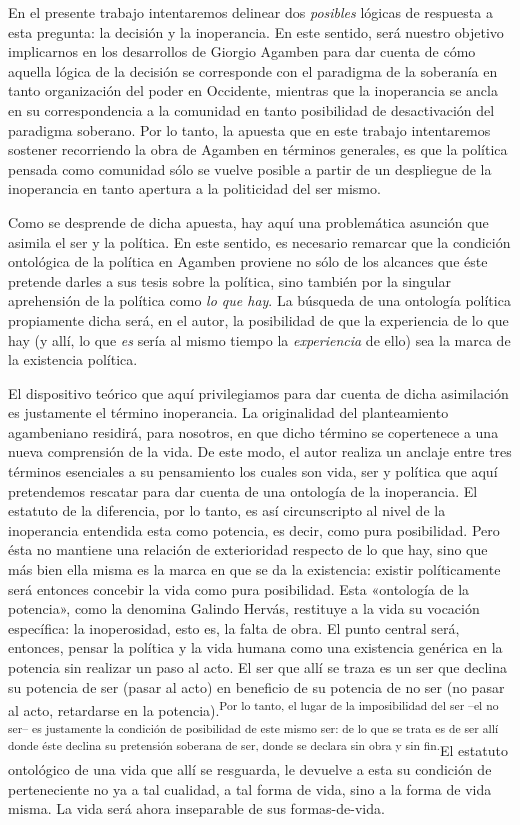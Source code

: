 En el presente trabajo intentaremos delinear dos \emph{posibles }lógicas de respuesta a esta pregunta: la decisión y la inoperancia. En este sentido, será nuestro objetivo implicarnos en los desarrollos de Giorgio Agamben para dar cuenta de cómo aquella lógica de la decisión se corresponde con el paradigma de la soberanía en tanto organización del poder en Occidente, mientras que la inoperancia se ancla en su correspondencia a la comunidad en tanto posibilidad de desactivación del paradigma soberano. Por lo tanto, la apuesta que en este trabajo intentaremos sostener recorriendo la obra de Agamben en términos generales, es que la política pensada como comunidad sólo se vuelve posible a partir de un despliegue de la inoperancia en tanto apertura a la politicidad del ser mismo.

Como se desprende de dicha apuesta, hay aquí una problemática asunción que asimila el ser y la política. En este sentido, es necesario remarcar que la condición ontológica de la política en Agamben proviene no sólo de los alcances que éste pretende darles a sus tesis sobre la política, sino también por la singular aprehensión de la política como \emph{lo que hay}. La búsqueda de una ontología política propiamente dicha será, en el autor, la posibilidad de que la experiencia de lo que hay (y allí, lo que \emph{es} sería al mismo tiempo la \emph{experiencia} de ello) sea la marca de la existencia política.

El dispositivo teórico que aquí privilegiamos para dar cuenta de dicha asimilación es justamente el término inoperancia. La originalidad del planteamiento agambeniano residirá, para nosotros, en que dicho término se copertenece a una nueva comprensión de la vida. De este modo, el autor realiza un anclaje entre tres términos esenciales a su pensamiento los cuales son vida, ser y política que aquí pretendemos rescatar para dar cuenta de una ontología de la inoperancia. El estatuto de la diferencia, por lo tanto, es así circunscripto al nivel de la inoperancia entendida esta como potencia, es decir, como pura posibilidad. Pero ésta no mantiene una relación de exterioridad respecto de lo que hay, sino que más bien ella misma es la marca en que se da la existencia: existir políticamente será entonces concebir la vida como pura posibilidad. Esta «ontología de la potencia», como la denomina Galindo Hervás, restituye a la vida su vocación específica: la inoperosidad, esto es, la falta de obra. El punto central será, entonces, pensar la política y la vida humana como una existencia genérica en la potencia sin realizar un paso al acto. El ser que allí se traza es un ser que declina su potencia de ser (pasar al acto) en beneficio de su potencia de no ser (no pasar al acto, retardarse en la potencia).\textsuperscript{Por lo tanto, el lugar de la imposibilidad del ser --el no ser-- es justamente la condición de posibilidad de este mismo ser: de lo que se trata es de ser allí donde éste declina su pretensión soberana de ser, donde se declara sin obra y sin fin.}El estatuto ontológico de una vida que allí se resguarda, le devuelve a esta su condición de perteneciente no ya a tal cualidad, a tal forma de vida, sino a la forma de vida misma. La vida será ahora inseparable de sus formas-de-vida.

